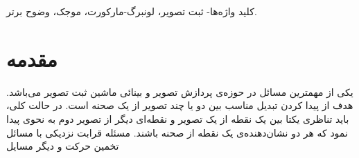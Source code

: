 \documentclass[11pt,a4paper,twocolumn]{article}
\makeatletter
\numberwithin{table}{section}
\let\orig@lr\lr
\renewcommand*{\lr}[1]{\texorpdfstring{\orig@lr{#1}}{#1}}
\makeatother
\begin{document}
\title{\vspace{13mm}}
\author{
محمود امین‌طوسی، محمود فتحی و ناصر مزینی\\
دانشگاه علم و صنعت ایران، دانشکده مهندسی کامپیوتر\\
}

\date{}
\maketitle

\begin{abstract}
\AbstractBold
{
\vspace{-5mm}
چکیده -
روش لوکاس-کاناد از جمله معروف‌ترین روش‌های ثبت تصویر مبتنی بر ناحیه است که گونه‌های مختلفی از آن تاکنون ارائه شده است. هدف اصلی در روشهای مختلف ثبت تصویر پیدا کردن پارامترهای مدل تبدیل، برای نگاشت دقیق یک تصویر بر روی مختصات تصویر دیگر است. در الگوریتم لوکاس-کاناد این امر از طریق کمینه‌سازی یک تابع مشخص کننده‌ی میزان تفاوت یک تصویر و تبدیل شده‌ی دیگری حاصل می‌شود. معمولاً تابع مذکور مربع تفاضلات بین دو تصویر در نظر گرفته می‌شود. در این مقاله از معیار شباهت ساختاری دو تصویر به عنوان ضریبی برای این تابع استفاده شده است. نحوه‌ی لحاظ کردن این معیار شباهت در فرمولبندی الگوریتم لوکاس-کاناد به صورت ریاضی بیان شده است. کمینه‌سازی مورد نظر با استفاده از شیوه‌ی بهینه‌سازی لونبرگ-مارکورت انجام شده است. نتایج پیاده‌سازی‌های انجام شده برتری شیوه‌ی پیشنهادی را در مقایسه با الگوریتم اصلی لوکاس-کاناد (با روشهای کمینه‌سازی گوس-نیوتن و لونبرگ-مارکورت) از نقطه نظر سرعت همگرائی نشان می‌دهد. همچنین کارائی شیوه‌ی پیشنهادی در مسئله‌ی وضوح برتر در مقایسه با چند روش دیگر نشان داده شده است.}
 \end{abstract}
{کلید واژه‌ها}-  ثبت تصویر، لونبرگ-مارکورت، موجک، وضوح برتر.\\

\section{مقدمه}
یکی از  مهمترین مسائل در حوزه‌ی پردازش تصویر و بینائی ماشین  ثبت تصویر می‌باشد. هدف از  پیدا کردن تبدیل مناسب بین دو یا چند تصویر از یک صحنه است. در حالت کلی، باید تناظری یکتا بین یک نقطه از یک تصویر و نقطه‌ای دیگر از تصویر دوم  به نحوی پیدا نمود که هر دو نشان‌دهنده‌ی یک نقطه از صحنه باشند. 
 مسئله‌  قرابت نزدیکی با مسائل  تخمین حرکت و دیگر مسایل 
\end{document}
